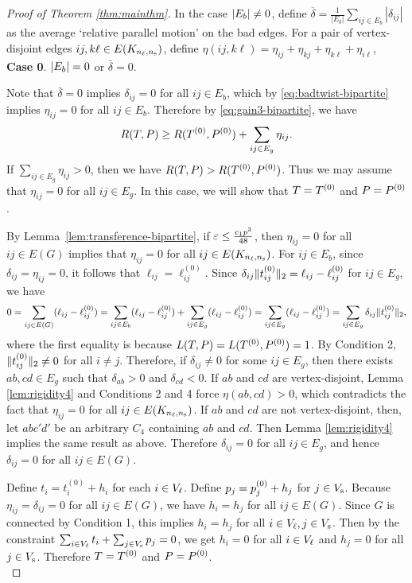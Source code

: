 \begin{proof}[Proof of Theorem \ref{thm:mainthm}]
In the case $|E_b| \neq 0$, define $\overline{\delta}=\frac{1}{|E_{b}|}\sum_{ij\in E_{b}}|\delta_{ij}|$
as the average `relative parallel motion' on the bad edges. For a pair of vertex-disjoint edges $ij,k\ell\in E(K_{n_\ell, n_\text{s}})$, define $\eta(ij,k\ell)=\eta_{ij} + \eta_{kj} + \eta_{k\ell} + \eta_{i\ell}$,
\\

\noindent \textbf{Case 0}. $|E_b| = 0$ or $\bar{\delta} = 0$.
\medskip

Note that $\bar{\delta}=0$ implies $\delta_{ij} =0$ for all $ij \in E_b$, which by \eqref{eq:badtwist-bipartite} implies
$\eta_{ij} =0$ for all $ij \in E_b$.  Therefore by \eqref{eq:gain3-bipartite}, we have
\[
	R(T, P) \geq R(T^{(0)}, P^{(0)}) + \sum_{ij \in E_g} \eta_{ij}.
\]
If $\sum_{ij \in E_g} \eta_{ij} > 0$, then we have $R(T, P) > R(T^{(0)}, P^{(0)})$. Thus 
we may assume that $\eta_{ij} = 0$ for all $ij \in E_g$. In this case, we will show that $T = T^{(0)}$ and $P = P^{(0)}$.

By Lemma~\ref{lem:transference-bipartite}, if $\varepsilon \le \frac{c_1p^3}{48}$, then
$\eta_{ij}=0$ for all $ij \in E(G)$ implies that
$\eta_{ij} = 0$ for all $ij \in E(K_{n_\ell, n_\text{s}})$. 
For $ij \in E_b$, since $\delta_{ij} = \eta_{ij} = 0$, it follows that $\ell_{ij} = \ell_{ij}^{(0)}$.
Since $\delta_{ij} \|t^{{(0)}}_{ij}\|_2 = \ell_{ij} - \ell_{ij}^{(0)}$ for $ij \in E_g$, we have
\[
	0
	= \sum_{ij \in E(G)} (\ell_{ij} - \ell_{ij}^{(0)})
	= \sum_{ij \in E_b} (\ell_{ij} - \ell_{ij}^{(0)}) + \sum_{ij \in E_g} (\ell_{ij} - \ell_{ij}^{(0)})
	= \sum_{ij \in E_g} (\ell_{ij} - \ell_{ij}^{(0)})
	= \sum_{ij \in E_g} \delta_{ij} \|t^{{(0)}}_{ij}\|_2,
\] 
where the first equality is because $L(T, P) = L(T^{(0)}, P^{(0)}) = 1$.
By Condition 2, $\|t^{{(0)}}_{ij}\|_2 \neq 0$ for all $i \neq j$. Therefore, if $\delta_{ij} \neq 0$ for some $ij \in E_g$, then there exists $ab, cd \in E_g$ 
such that $\delta_{ab} > 0$ and $\delta_{cd} < 0$. 
If $ab$ and $cd$ are vertex-disjoint, Lemma \ref{lem:rigidity4} and Conditions 2 and 4 force $\eta(ab,cd) > 0$, which contradicts the fact that
$\eta_{ij} = 0$ for all $ij \in E(K_{n_\ell, n_\text{s}})$.  If $ab$ and $cd$ are not vertex-disjoint, then, let $abc'd'$ be an arbitrary $C_4$ containing $ab$ and $cd$.  Then Lemma \ref{lem:rigidity4} implies the same result as above.
Therefore $\delta_{ij} = 0$ for all $ij \in E_g$, and hence
$\delta_{ij} = 0$ for all $ij \in E(G)$.  

Define $t_i = t_i^{(0)} + h_i$ for each $i \in V_\ell$.  Define $p_j = p^{{(0)}}_{j} + h_j$ for $j \in V_\text{s}$. Because $\eta_{ij} = \delta_{ij} = 0$ for all $ij \in E(G)$, we have $h_i = h_j$ 
for all $ij \in E(G)$. Since $G$ is connected by Condition 1, this implies $h_i = h_j$ for all 
$i \in V_\ell, j \in V_\text{s}$. Then by the constraint $\sum_{i \in V_\ell} t_i + \sum_{j \in V_\text{s}} p_j = 0$, 
we get $h_i = 0$ for all $i \in V_\ell$ and $h_j = 0$ for all $j \in V_\text{s}$. Therefore $T = T^{(0)}$ and $P = P^{(0)}$. \\


\end{proof}
